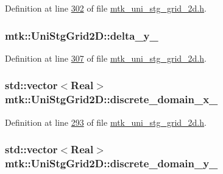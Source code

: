 Definition at line \hyperlink{mtk__uni__stg__grid__2d_8h_source_l00302}{302} of file \hyperlink{mtk__uni__stg__grid__2d_8h_source}{mtk\+\_\+uni\+\_\+stg\+\_\+grid\+\_\+2d.\+h}.

\hypertarget{classmtk_1_1UniStgGrid2D_ace5af3c991f241a895318b9761db73eb}{
\subsubsection[{delta\+\_\+y\+\_\+}]{ mtk\+::\+Uni\+Stg\+Grid2\+D\+::delta\+\_\+y\+\_\+\hspace{0.3cm}{\ttfamily [private]}}}\label{classmtk_1_1UniStgGrid2D_ace5af3c991f241a895318b9761db73eb}


Definition at line \hyperlink{mtk__uni__stg__grid__2d_8h_source_l00307}{307} of file \hyperlink{mtk__uni__stg__grid__2d_8h_source}{mtk\+\_\+uni\+\_\+stg\+\_\+grid\+\_\+2d.\+h}.

\hypertarget{classmtk_1_1UniStgGrid2D_ab15979865852583a46662ea592f27a4f}{
\subsubsection[{discrete\+\_\+domain\+\_\+x\+\_\+}]{\setlength{\rightskip}{0pt plus 5cm}std\+::vector$<${\bf Real}$>$ mtk\+::\+Uni\+Stg\+Grid2\+D\+::discrete\+\_\+domain\+\_\+x\+\_\+\hspace{0.3cm}{\ttfamily [private]}}}\label{classmtk_1_1UniStgGrid2D_ab15979865852583a46662ea592f27a4f}


Definition at line \hyperlink{mtk__uni__stg__grid__2d_8h_source_l00293}{293} of file \hyperlink{mtk__uni__stg__grid__2d_8h_source}{mtk\+\_\+uni\+\_\+stg\+\_\+grid\+\_\+2d.\+h}.

\hypertarget{classmtk_1_1UniStgGrid2D_ad69f93d4b27707d97f209b907383a7a2}{
\subsubsection[{discrete\+\_\+domain\+\_\+y\+\_\+}]{\setlength{\rightskip}{0pt plus 5cm}std\+::vector$<${\bf Real}$>$ mtk\+::\+Uni\+Stg\+Grid2\+D\+::discrete\+\_\+domain\+\_\+y\+\_\+\hspace{0.3cm}{\ttfamily [private]}}}\label{classmtk_1_1UniStgGrid2D_ad69f93d4b27707d97f209b907383a7a2}


